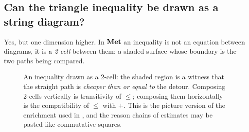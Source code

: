 \subsection{Can the triangle inequality be drawn as a string diagram?}

Yes, but one dimension higher. In $\mathbf{Met}$ an inequality is not an equation between
diagrams, it is a \emph{2-cell} between them: a shaded surface whose boundary is the two
paths being compared.

\begin{figure}[H]
\centering
{}
\caption{An inequality drawn as a 2-cell: the shaded region is a witness that the
straight path is \emph{cheaper than or equal to} the detour. Composing 2-cells vertically
is transitivity of $\le$; composing them horizontally is the compatibility of $\le$ with
$+$. This is the picture version of the enrichment used in
, and the reason chains of estimates may be pasted
like commutative squares.}
\label{fig:2cell}
\end{figure}

